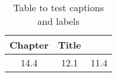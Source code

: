 \begin{table}[h!]
\centering
\begin{tabular}{ccc}
{Chapter} & {Title} \\ 
\hline
{14.4} & {12.1} & {11.4} \\
\end{tabular}
\caption{Table to test captions and labels}
\label{table:1}
\end{table}